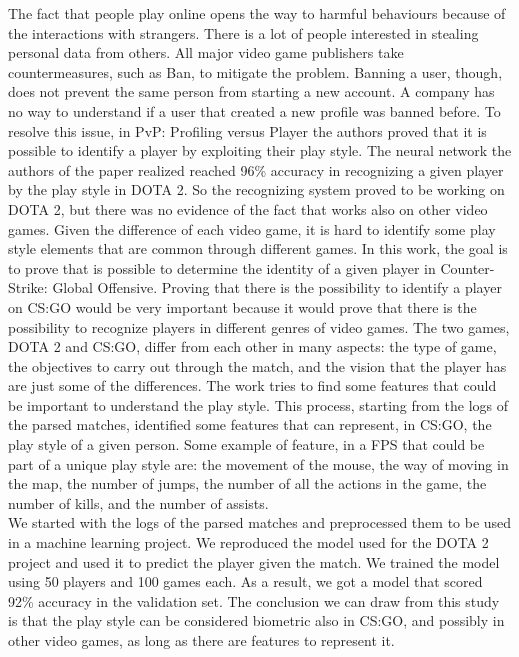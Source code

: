 	The fact that people play online opens the way to harmful behaviours because of the interactions with strangers. 
	There is a lot of people interested in stealing personal data from others. 
	All major video game publishers take countermeasures, such as \gls{Ban}, to mitigate the problem. 
	Banning a user, though, does not prevent the same person from starting a new account. 
	A company has no way to understand if a user that created a new profile was banned before. 
	To resolve this issue, in PvP: Profiling versus Player \cite{10.1007/978-3-030-62974-8_22} the authors proved that it is possible to identify a player by exploiting their play style. 
	The neural network the authors of the paper realized reached 96\% accuracy in recognizing a given player by the play style in DOTA 2.
	So the recognizing system proved to be working on DOTA 2, but there was no evidence of the fact that works also on other video games.
	Given the difference of each video game, it is hard to identify some play style elements that are common through different games. 
	In this work, the goal is to prove that is possible to determine the identity of a given player in Counter-Strike: Global Offensive. 
	Proving that there is the possibility to identify a player on CS:GO would be very important because it would prove that there is the possibility to recognize players in different genres of video games. 
	The two games, DOTA 2 and CS:GO, differ from each other in many aspects:
	the type of game,
	the objectives to carry out through the match, and
	the vision that the player has
	are just some of the differences.
	The work tries to find some features that could be important to understand the play style. 
	This process, starting from the logs of the parsed matches, identified some features that can represent, in CS:GO, the play style of a given person.
	Some example of feature, in a \gls{FPS} that could be part of a unique play style are:
	the movement of the mouse, 
	the way of moving in the map, 
	the number of jumps, 
	the number of all the actions in the game, 
	the number of kills, 
	and the number of assists.\\
	We started with the logs of the parsed matches and preprocessed them to be used in a machine learning project. 
	We reproduced the model used for the DOTA 2 project and used it to predict the player given the match. 
	We trained the model using 50 players and 100 games each. 
	As a result, we got a model that scored 92\% accuracy in the validation set.
	The conclusion we can draw from this study is that the play style can be considered biometric also in CS:GO, and possibly in other video games, as long as there are features to represent it.
